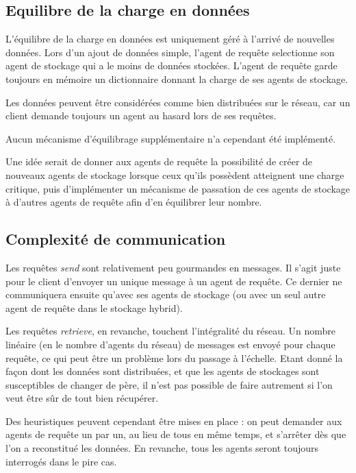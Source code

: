 \documentclass[a4paper]{article}
\begin{document}
\subsection{Equilibre de la charge en données}

L'équilibre de la charge en données est uniquement géré à l'arrivé de nouvelles données. Lors d'un ajout de données simple, l'agent de requête selectionne
son agent de stockage qui a le moins de données stockées. L'agent de requête garde toujours en mémoire
un dictionnaire donnant la charge de ses agents de stockage.

Les données peuvent être considérées comme bien distribuées sur le réseau, car un client
demande toujours un agent au hasard lors de ses requêtes.

Aucun mécanisme d'équilibrage supplémentaire n'a cependant été implémenté.

Une idée serait de donner aux agents de requête la possibilité de créer de nouveaux agents de stockage lorsque ceux qu'ils possèdent atteignent une charge critique, puis d'implémenter
un mécanisme de passation de ces agents de stockage à d'autres agents de requête afin d'en équilibrer leur nombre.

\subsection{Complexité de communication}

Les requêtes \emph{send} sont relativement peu gourmandes en messages. Il s'agit juste pour le client d'envoyer un unique message à un agent de requête. Ce dernier ne communiquera ensuite qu'avec ses
agents de stockage (ou avec un seul autre agent de requête dans le stockage hybrid).

Les requêtes \emph{retrieve}, en revanche, touchent l'intégralité du réseau. Un nombre linéaire (en le nombre d'agents du réseau) de messages est envoyé pour chaque requête, ce qui peut être un problème
lors du passage à l'échelle. Etant donné la façon dont les données sont distribuées, et que les agents de stockages sont susceptibles de changer de père, il n'est pas possible de faire autrement si l'on veut être sûr de tout bien récupérer.

Des heuristiques peuvent cependant être mises en place : on peut demander aux agents de requête un par un, au lieu de tous en même temps, et s'arrêter dès que l'on a reconstitué les données.
En revanche, tous les agents seront toujours interrogés dans le pire cas.
\end{document}
